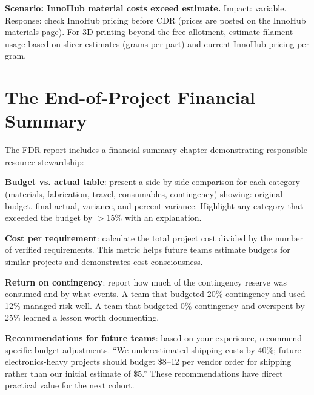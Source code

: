 \textbf{Scenario: InnoHub material costs exceed estimate.} Impact: variable. Response: check InnoHub pricing before CDR (prices are posted on the InnoHub materials page). For 3D printing beyond the free allotment, estimate filament usage based on slicer estimates (grams per part) and current InnoHub pricing per gram.



\section{The End-of-Project Financial Summary}
The FDR report includes a financial summary chapter demonstrating responsible resource stewardship:

\textbf{Budget vs. actual table}: present a side-by-side comparison for each category (materials, fabrication, travel, consumables, contingency) showing: original budget, final actual, variance, and percent variance. Highlight any category that exceeded the budget by $>$15\% with an explanation.

\textbf{Cost per requirement}: calculate the total project cost divided by the number of verified requirements. This metric helps future teams estimate budgets for similar projects and demonstrates cost-consciousness.

\textbf{Return on contingency}: report how much of the contingency reserve was consumed and by what events. A team that budgeted 20\% contingency and used 12\% managed risk well. A team that budgeted 0\% contingency and overspent by 25\% learned a lesson worth documenting.

\textbf{Recommendations for future teams}: based on your experience, recommend specific budget adjustments. ``We underestimated shipping costs by 40\%; future electronics-heavy projects should budget \$8--12 per vendor order for shipping rather than our initial estimate of \$5.'' These recommendations have direct practical value for the next cohort.



